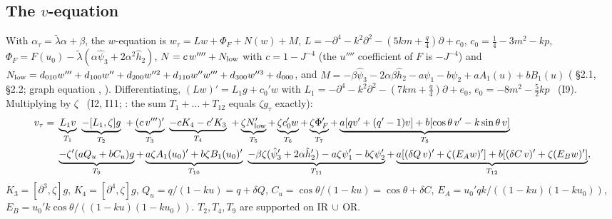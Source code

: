 \documentclass[11pt]{article}
\begin{document}
\subsection{The $v$-equation}\label{EI:sec:veq}
With $\alpha_\tau=\tilde\lambda\alpha+\beta$, the $w$-equation is $w_\tau=Lw+\Phi_F+N(w)+M$, $L=-\partial^4-k^2\partial^2-(5km+\frac q4)\partial+c_0$, $c_0=\frac14-3m^2-kp$, $\Phi_F=F(u_0)-\tilde\lambda(\alpha\hat\psi_3+2\alpha^2\hat h_2)$, $N=c\,w''''+N_{\rm low}$ with $c=1-J^{-4}$ (the $u''''$ coefficient of $F$ is $-J^{-4}$) and $N_{\rm low}=d_{010}w'''+d_{100}w''+d_{200}w''^2+d_{110}w''w'''+d_{300}w''^3+d_{000}$, and $M=-\beta\hat\psi_3-2\alpha\beta\hat h_2-a\psi_1-b\psi_2+aA_1(u)+bB_1(u)$ ( \S2.1, \S2.2; graph equation ,  \tR). Differentiating, $(Lw)'=L_1g+c_0'w$ with $L_1=-\partial^4-k^2\partial^2-(7km+\frac q4)\partial+e_0$, $e_0=-8m^2-\frac52kp$ \tS\ (I9). Multiplying by $\zeta$ \tS\ (I2, I11; : the sum $T_1+\dots+T_{12}$ equals $\zeta g_\tau$ exactly):
\begin{align*}
v_\tau={}&\underbrace{L_1v}_{T_1}\ \underbrace{-[L_1,\zeta]g}_{T_2}\ +\underbrace{(c\,v''')'}_{T_3}\ \underbrace{-cK_4-c'K_3}_{T_4}\ +\underbrace{\zeta N_{\rm low}'}_{T_5}+\underbrace{\zeta c_0'w}_{T_6}+\underbrace{\zeta\Phi_F'}_{T_7}
+\underbrace{a[qv'+(q'-1)v]+b[\cos\theta\,v'-k\sin\theta\,v]}_{T_8}\\
&\underbrace{-\zeta'(aQ_u+bC_u)g}_{T_9}+\underbrace{a\zeta A_1(u_0)'+b\zeta B_1(u_0)'}_{T_{10}}\ \underbrace{-\beta\zeta(\hat\psi_3'+2\alpha\hat h_2')-a\zeta\psi_1'-b\zeta\psi_2'}_{T_{11}}
+\underbrace{a[(\delta Q\,v)'+\zeta(E_Aw)']+b[(\delta C\,v)'+\zeta(E_Bw)']}_{T_{12}},
\end{align*}
$K_3=[\partial^3,\zeta]g$, $K_4=[\partial^4,\zeta]g$, $Q_u=q/(1-ku)=q+\delta Q$, $C_u=\cos\theta/(1-ku)=\cos\theta+\delta C$, $E_A=u_0'qk/((1-ku)(1-ku_0))$, $E_B=u_0'k\cos\theta/((1-ku)(1-ku_0))$. $T_2,T_4,T_9$ are supported on IR$\,\cup\,$OR.
\end{document}
